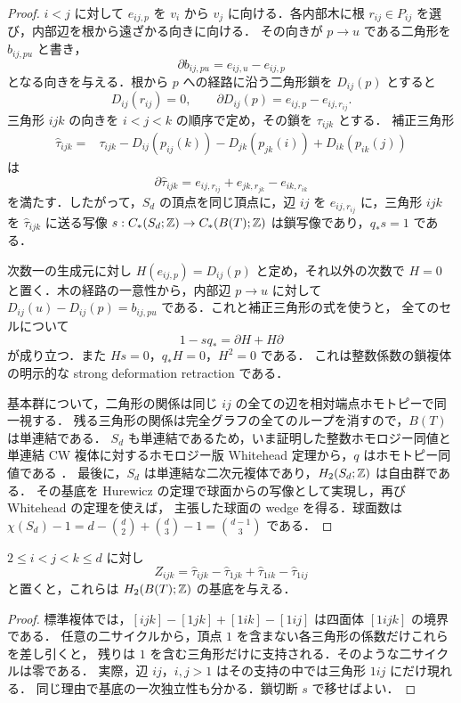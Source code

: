 \begin{proof}
$i<j$ に対して $e_{ij,p}$ を $v_i$ から $v_j$ に向ける．各内部木に根
$r_{ij}\in P_{ij}$ を選び，内部辺を根から遠ざかる向きに向ける．
その向きが $p\to u$ である二角形を $b_{ij,pu}$ と書き，
\[
 \partial b_{ij,pu}=e_{ij,u}-e_{ij,p}
\]
となる向きを与える．根から $p$ への経路に沿う二角形鎖を $D_{ij}(p)$ とすると
\[
 D_{ij}(r_{ij})=0,\qquad
 \partial D_{ij}(p)=e_{ij,p}-e_{ij,r_{ij}}.
\]
三角形 $ijk$ の向きを $i<j<k$ の順序で定め，その鎖を $\tau_{ijk}$ とする．
補正三角形
\begin{align*}
 \widehat\tau_{ijk}={}&\tau_{ijk}
   -D_{ij}(p_{ij}(k))-D_{jk}(p_{jk}(i))
   +D_{ik}(p_{ik}(j))
\end{align*}
は
\[
 \partial\widehat\tau_{ijk}
 =e_{ij,r_{ij}}+e_{jk,r_{jk}}-e_{ik,r_{ik}}
\]
を満たす．したがって，$S_d$ の頂点を同じ頂点に，辺 $ij$ を
$e_{ij,r_{ij}}$ に，三角形 $ijk$ を $\widehat\tau_{ijk}$ に送る写像
$s:C_*(S_d;\mathbb Z)\to C_*(B(T);\mathbb Z)$ は鎖写像であり，$q_*s=1$ である．

次数一の生成元に対し $H(e_{ij,p})=D_{ij}(p)$ と定め，それ以外の次数で
$H=0$ と置く．木の経路の一意性から，内部辺 $p\to u$ に対して
$D_{ij}(u)-D_{ij}(p)=b_{ij,pu}$ である．これと補正三角形の式を使うと，
全てのセルについて
\[
 1-sq_* =\partial H+H\partial
\]
が成り立つ．また $Hs=0$，$q_*H=0$，$H^2=0$ である．
これは整数係数の鎖複体の明示的な strong deformation retraction である．

基本群について，二角形の関係は同じ $ij$ の全ての辺を相対端点ホモトピーで同一視する．
残る三角形の関係は完全グラフの全てのループを消すので，$B(T)$ は単連結である．
$S_d$ も単連結であるため，いま証明した整数ホモロジー同値と
単連結 CW 複体に対するホモロジー版 Whitehead 定理から，$q$ はホモトピー同値である
\cite[Corollary 4.33]{Hatcher}．
最後に，$S_d$ は単連結な二次元複体であり，$H_2(S_d;\mathbb Z)$ は自由群である．
その基底を Hurewicz の定理で球面からの写像として実現し，再び Whitehead の定理を使えば，
主張した球面の wedge を得る．球面数は
$\chi(S_d)-1=d-\binom d2+\binom d3-1=\binom{d-1}{3}$ である．
\end{proof}

\begin{corollary}[整数二サイクルの基底]\label{topo:cycles}
$2\leq i<j<k\leq d$ に対し
\[
 Z_{ijk}=\widehat\tau_{ijk}-\widehat\tau_{1jk}
              +\widehat\tau_{1ik}-\widehat\tau_{1ij}
\]
と置くと，これらは $H_2(B(T);\mathbb Z)$ の基底を与える．
\end{corollary}

\begin{proof}
標準複体では，$[ijk]-[1jk]+[1ik]-[1ij]$ は四面体 $[1ijk]$ の境界である．
任意の二サイクルから，頂点 $1$ を含まない各三角形の係数だけこれらを差し引くと，
残りは $1$ を含む三角形だけに支持される．そのような二サイクルは零である．
実際，辺 $ij$，$i,j>1$ はその支持の中では三角形 $1ij$ にだけ現れる．
同じ理由で基底の一次独立性も分かる．鎖切断 $s$ で移せばよい．
\end{proof}

